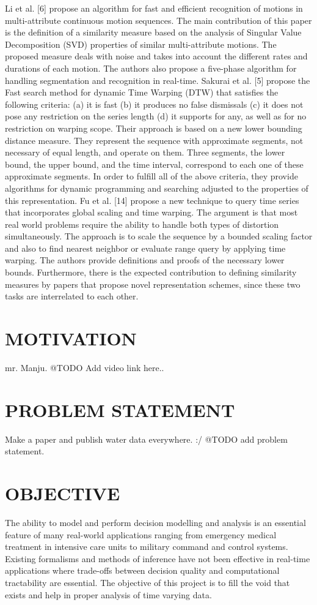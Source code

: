 \documentclass[12pt]{report}
\begin{document}
\begin{itemize}
Li et al. [6] propose an algorithm for fast and efficient recognition of motions in multi-attribute continuous motion sequences. The main contribution of this paper is the definition of a similarity measure based on the analysis of Singular Value Decomposition (SVD) properties of similar multi-attribute motions.  The proposed measure deals with noise and takes into account the different rates and durations of each motion. The authors also propose a five-phase algorithm for handling segmentation and recognition in real-time.
Sakurai et al. [5] propose the Fast search method for dynamic Time Warping (DTW) that satisfies the following criteria: 
(a) it is fast 
(b) it produces no false dismissals 
(c) it does not pose any restriction on the series length 
(d) it supports for any, as well as for no restriction on warping scope.
 Their approach is based on a new lower bounding distance measure. They represent the sequence with approximate segments, not necessary of equal length, and operate on them. Three segments, the lower bound, the upper bound, and the time interval, correspond to each one of these approximate segments. In order to fulfill all of the above criteria, they provide algorithms for dynamic programming and searching adjusted to the properties of this representation. Fu et al. [14] propose a new technique to query time series that incorporates global scaling and time warping. The argument is that most real world problems require the ability to handle both types of distortion simultaneously. The approach is to scale the sequence by a bounded scaling factor and also to find nearest neighbor or evaluate range query by applying time warping. The authors provide definitions and proofs of the necessary lower bounds.
Furthermore, there is the expected contribution to defining similarity measures by papers that propose novel representation schemes, since these two tasks are interrelated to each other. 
\end{itemize}
\section{MOTIVATION}
mr. Manju. 
@TODO Add video link here..
\section{PROBLEM STATEMENT}
Make a paper and publish water data everywhere. :/
@TODO add problem statement. 

\section{OBJECTIVE}
The ability to model and perform decision modelling and analysis is an essential feature of many real-world applications ranging from emergency medical treatment in intensive care units to military command and control systems. Existing formalisms and methods of inference have not been effective in real-time applications where trade-offs between decision quality and computational tractability are essential. The objective of this project is to fill the void that exists and help in proper analysis of time varying data.
\end{document}

